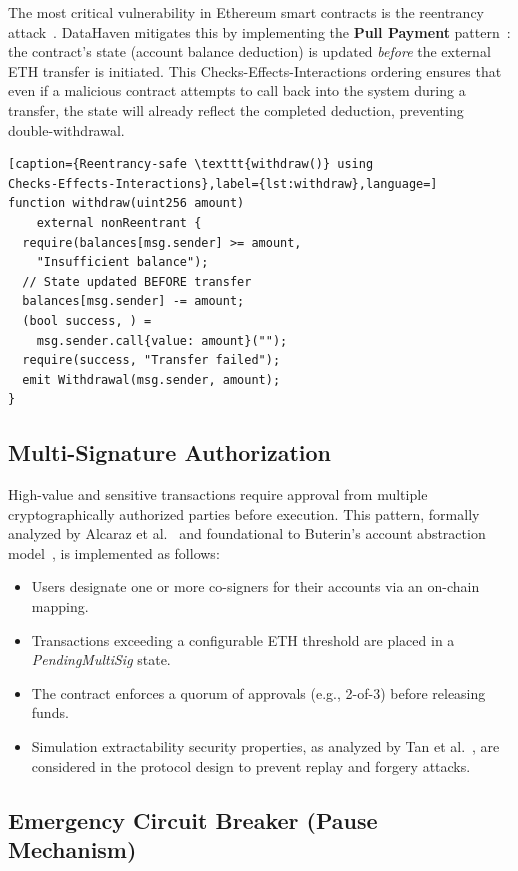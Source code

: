 \documentclass[conference]{IEEEtran}
\begin{document}
The most critical vulnerability in Ethereum smart contracts is the reentrancy
attack~\cite{ref15,ref19}. DataHaven mitigates this by implementing the
\textbf{Pull Payment} pattern~\cite{ref13}: the contract's state (account
balance deduction) is updated \emph{before} the external ETH transfer is
initiated. This Checks-Effects-Interactions ordering ensures that even if a
malicious contract attempts to call back into the system during a transfer, the
state will already reflect the completed deduction, preventing double-withdrawal.

\begin{lstlisting}[caption={Reentrancy-safe \texttt{withdraw()} using
Checks-Effects-Interactions},label={lst:withdraw},language=]
function withdraw(uint256 amount)
    external nonReentrant {
  require(balances[msg.sender] >= amount,
    "Insufficient balance");
  // State updated BEFORE transfer
  balances[msg.sender] -= amount;
  (bool success, ) =
    msg.sender.call{value: amount}("");
  require(success, "Transfer failed");
  emit Withdrawal(msg.sender, amount);
}
\end{lstlisting}

\subsection{Multi-Signature Authorization}

High-value and sensitive transactions require approval from multiple
cryptographically authorized parties before execution. This pattern, formally
analyzed by Alcaraz et al.~\cite{ref2,ref18} and foundational to Buterin's
account abstraction model~\cite{ref4}, is implemented as follows:

\begin{itemize}
  \item Users designate one or more co-signers for their accounts via an
    on-chain mapping.
  \item Transactions exceeding a configurable ETH threshold are placed in a
    \textit{PendingMultiSig} state.
  \item The contract enforces a quorum of approvals (e.g., 2-of-3) before
    releasing funds.
  \item Simulation extractability security properties, as analyzed by Tan
    et al.~\cite{ref17}, are considered in the protocol design to prevent
    replay and forgery attacks.
\end{itemize}

\subsection{Emergency Circuit Breaker (Pause Mechanism)}
\end{document}
